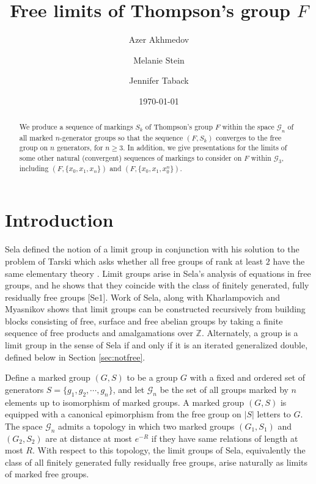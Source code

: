 \documentclass[11pt]{amsart}
\title{Free limits of Thompson's group $F$}
\author[Azer Akhmedov]{Azer Akhmedov}
\author[Melanie Stein] {Melanie Stein}
\author[Jennifer Taback] {Jennifer Taback}
\date{\today}
\begin{document}
\maketitle

\begin{abstract}
We produce a sequence of markings $S_k$ of Thompson's group $F$ within the space ${\mathcal G}_n$ of all marked $n$-generator groups so that the sequence $(F,S_k)$ converges to the free group on $n$ generators, for $n \geq 3$.
In addition, we give presentations for the limits of some other natural (convergent) sequences of markings to consider on $F$ within ${\mathcal G}_3$, including $(F,\{x_0,x_1,x_n\})$ and $(F,\{x_0,x_1,x_0^n\})$.
\end{abstract}

\section{Introduction}

Sela defined the notion of a limit group in conjunction with his
solution to the problem of Tarski which asks whether all free
groups of rank at least $2$ have the same elementary theory
\cite{S1,S2}.  Limit groups arise in Sela's analysis of equations
in free groups, and he shows that they coincide with the class of
finitely generated, fully residually free groups [Se1].  Work of
Sela, along with Kharlampovich and Myasnikov \cite{S1,KM1,KM2}
shows that limit groups can be constructed recursively from
building blocks consisting of free, surface and free abelian
groups by taking a finite sequence of free products and
amalgamations over ${\mathbb Z}$.  Alternately, a group is a limit group in the sense of Sela
if and only if it is an iterated generalized double, defined below in Section \ref{sec:notfree}.

Define a marked group $(G,S)$ to be a group $G$ with a fixed and
ordered set of generators $S=\{g_1,g_2, \cdots ,g_n\}$, and let
${\mathcal G}_n$ be the set of all groups marked by $n$ elements
up to isomorphism of marked groups.  A marked group $(G,S)$ is
equipped with a canonical epimorphism from the free group on $|S|$
letters to $G$.  The space ${\mathcal G}_n$ admits a topology
in which two marked groups $(G_1,S_1)$ and $(G_2,S_2)$ are at
distance at most $e^{-R}$ if they have same relations of length at
most $R$. With respect to this topology, the limit groups of Sela,
equivalently the class of all finitely generated fully residually
free groups, arise naturally as limits of marked free groups.
\end{document}
